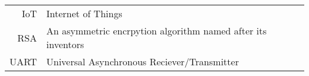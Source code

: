 


\begin{center}
\label{abbrv}
\begin{tabular}{r l}
	IoT & Internet of Things \\
	RSA & An asymmetric encrpytion algorithm named after its inventors \\
	UART & Universal Asynchronous Reciever/Transmitter
\end{tabular}
\end{center}


\newpage

